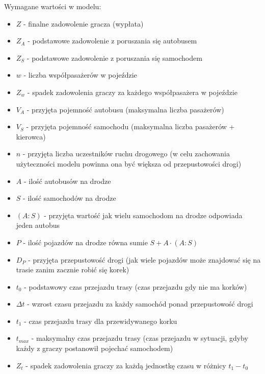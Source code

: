 \documentclass[12pt,a4paper]{article}
\begin{document}
Wymagane wartości w modelu:
\begin{itemize}
	\item
	$Z$ - finalne zadowolenie gracza (wypłata)

	\item
	$Z_A$ - podstawowe zadowolenie z poruszania się autobusem
	
	\item
	$Z_S$ - podstawowe zadowolenie z poruszania się samochodem
	
	\item
	$w$ - liczba współpasażerów w pojeździe
	
	\item
	$Z_{w}$ - spadek zadowolenia graczy za każdego  współpasażera w pojeździe
	
	\item
	$V_A$ - przyjęta pojemność autobusu (maksymalna liczba pasażerów)
	
	\item
	$V_S$ - przyjęta pojemność samochodu (maksymalna liczba pasażerów + kierowca)
	
	\item
	$n$ - przyjęta liczba uczestników ruchu drogowego (w celu zachowania użyteczności modelu powinna ona być większa od przepustowości drogi)
	
	\item
	$A$ - ilość autobusów na drodze
	
	\item
	$S$ - ilość samochodów na drodze
	
	\item
	$(A:S)$ - przyjęta wartość jak wielu samochodom na drodze odpowiada jeden autobus
	
	\item
	$P$ - ilość pojazdów na drodze równa sumie $S+ A \cdot (A:S)$
	
	\item
	$D_P$ - przyjęta przepustowość drogi (jak wiele pojazdów może znajdować się na trasie zanim zacznie robić się korek)
	
	\item
	$t_0$ - podstawowy czas przejazdu trasy (czas przejazdu gdy nie ma korków)
	
	\item
	$\Delta{t}$ - wzrost czasu przejazdu za każdy samochód ponad przepustowość drogi
	
	\item
	$t_1$ - czas przejazdu trasy dla przewidywanego korku
	
	\item
	$t_{max}$ - maksymalny czas przejazdu trasy (czas przejazdu w sytuacji, gdyby każdy z graczy postanowił pojechać samochodem)
	
	\item
	$Z_t$ - spadek zadowolenia graczy za każdą jednostkę czasu w różnicy $t_1 - t_0$
\end{itemize}
\end{document}
